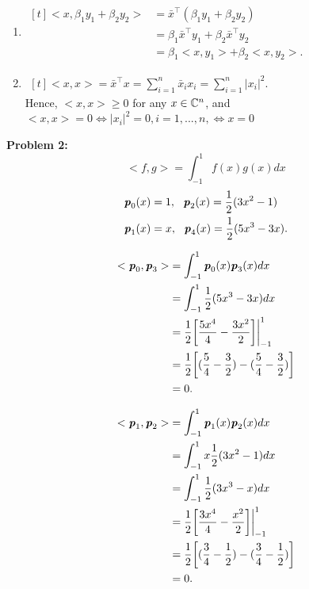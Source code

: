 \documentclass[letterpaper]{article}
\begin{document}
\begin{enumerate}
\begin{enumerate}
\item $\begin{aligned}[t]<x, \beta_1 y_1+\beta_2 y_2> &= \bar{x}^\top(\beta_1 y_1+\beta_2 y_2)\\
& = \beta_1 \bar{x}^\top y_1+\beta_2 \bar{x}^\top y_2 \\
& = \beta_1<x, y_1>+\beta_2<x, y_2>. \end{aligned}$

\item $\begin{aligned}[t]<x, x> = \bar{x}^\top x = \sum_{i=1}^n \bar{x}_i x_i = \sum_{i=1}^n |x_i|^2.\end{aligned}$
\smallskip \\
Hence, $<x,x>\geq 0$ for any $x \in \mathbb C^n$, and $<x,x>=0 \iff |x_i|^2 = 0, i = 1, ..., n, \iff x=0$
\end{enumerate}
\end{enumerate}

\noindent \textbf{Problem  2:}
$$<f, g> = \int_{-1}^1 f(x)g(x)dx$$
$$\begin{aligned}\textbf{\textit{p}}_0(x)&=1,~~\textbf{\textit{p}}_2(x)=\frac{1}{2}(3x^2-1) \\
\textbf{\textit{p}}_1(x)&=x,~~\textbf{\textit{p}}_4(x)=\frac{1}{2}(5x^3-3x).\end{aligned}$$

$$\begin{aligned}<\textbf{\textit{p}}_0, \textbf{\textit{p}}_3> &=\int_{-1}^{1}\textbf{\textit{p}}_0(x)\textbf{\textit{p}}_3(x)dx\\
&=\int_{-1}^{1}\frac{1}{2}(5x^3-3x)dx\\
&=\frac{1}{2}\bigg[\frac{5x^4}{4}-\frac{3x^2}{2}\bigg]\bigg|_{-1}^1\\
&=\frac{1}{2}\bigg[(\frac{5}{4}-\frac{3}{2})-(\frac{5}{4}-\frac{3}{2})\bigg]\\
&=0.\end{aligned}$$

$$\begin{aligned}<\textbf{\textit{p}}_1, \textbf{\textit{p}}_2> &=\int_{-1}^{1}\textbf{\textit{p}}_1(x)\textbf{\textit{p}}_2(x)dx\\
&=\int_{-1}^{1}x\frac{1}{2}(3x^2-1)dx\\
&=\int_{-1}^{1}\frac{1}{2}(3x^3-x)dx\\
&=\frac{1}{2}\bigg[\frac{3x^4}{4}-\frac{x^2}{2}\bigg]\bigg|_{-1}^1\\
&=\frac{1}{2}\bigg[(\frac{3}{4}-\frac{1}{2})-(\frac{3}{4}-\frac{1}{2})\bigg]\\
&=0.\end{aligned}$$
\end{document}
